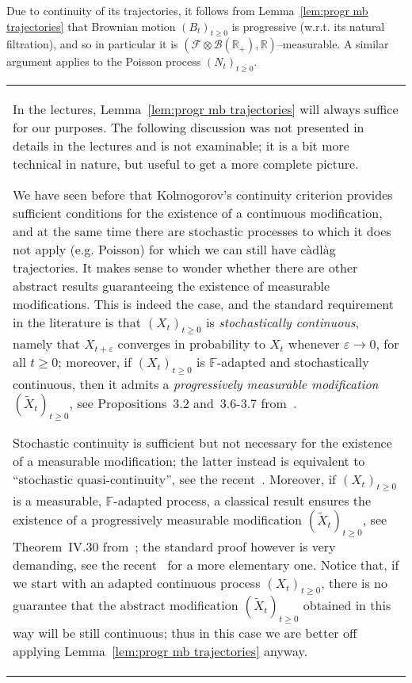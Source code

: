 \documentclass{article}
\newcommand{\emph}[1]{{\em #1\/}}
\newcommand{\textbf}[1]{\text{{\bfseries{#1}}}}
\newcommand{\1}{\1}
\begin{document}
{\begin{remark}
  Due to continuity of its trajectories, it follows from Lemma~\ref{lem:progr
  mb trajectories} that Brownian motion $(B_t)_{t \geqslant 0}$ is progressive
  (w.r.t. its natural filtration), and so in particular it is $(\mathcal{F}
  \otimes \mathcal{B}(\mathbb{R}_+), \mathbb{R})$--measurable. A similar
  argument applies to the Poisson process $(N_t)_{t \geqslant 0}$.
\end{remark}

{\noindent}\begin{tabularx}{1.0\textwidth}{@{}X@{}}
  \textbf{Existence of (progressively) measurable modifications:} In the
  lectures, Lemma~\ref{lem:progr mb trajectories} will always suffice for our
  purposes. The following discussion was not presented in details in the
  lectures and is not examinable; it is a bit more technical in nature, but
  useful to get a more complete picture.
  
  We have seen before that Kolmogorov's continuity criterion provides
  sufficient conditions for the existence of a continuous modification, and at
  the same time there are stochastic processes to which it does not apply
  (e.g. Poisson) for which we can still have c{\`a}dl{\`a}g trajectories. It
  makes sense to wonder whether there are other abstract results guaranteeing
  the existence of measurable modifications. This is indeed the case, and the
  standard requirement in the literature is that $(X_t)_{t \geqslant 0}$ is
  {\emph{stochastically continuous}}, namely that $X_{t + \varepsilon}$
  converges in probability to $X_t$ whenever $\varepsilon \rightarrow 0$, for
  all $t \geqslant 0$; moreover, if $(X_t)_{t \geqslant 0}$ is
  $\mathbb{F}$-adapted and stochastically continuous, then it admits a
  {\emph{progressively measurable modification}} $(\tilde{X}_t)_{t \geqslant
  0}$, see Propositions~3.2 and~3.6-3.7 from~{\cite{DaPrato2014}}.
  
  Stochastic continuity is sufficient but not necessary for the existence of a
  measurable modification; the latter instead is equivalent to ``stochastic
  quasi-continuity'', see the recent~{\cite{DiNunno2001}}. Moreover, if
  $(X_t)_{t \geqslant 0}$ is a measurable, $\mathbb{F}$-adapted process, a
  classical result ensures the existence of a progressively measurable
  modification $(\tilde{X}_t)_{t \geqslant 0}$, see Theorem~IV.30
  from~{\cite{Dellacherie1978}}; the standard proof however is very demanding,
  see the recent~{\cite{OndSei2013}} for a more elementary one. Notice that,
  if we start with an adapted continuous process $(X_t)_{t \geqslant 0}$,
  there is no guarantee that the abstract modification $(\tilde{X}_t)_{t
  \geqslant 0}$ obtained in this way will be still continuous; thus in this
  case we are better off applying Lemma~\ref{lem:progr mb trajectories}
  anyway.
\end{tabularx}

}
\end{document}
